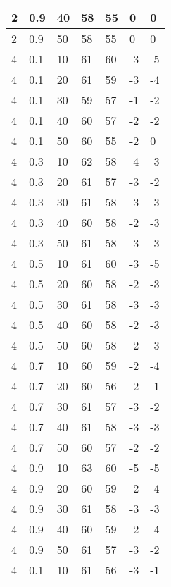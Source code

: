 \begin{longtable}{|l|l|l|l|l|l|l|}
		2     & 0.9 & 40   & 58 & 55 & 0   & 0   \\ \hline
		2     & 0.9 & 50   & 58 & 55 & 0   & 0   \\ \hline
		4     & 0.1 & 10   & 61 & 60 & -3  & -5  \\ \hline
		4     & 0.1 & 20   & 61 & 59 & -3  & -4  \\ \hline
		4     & 0.1 & 30   & 59 & 57 & -1  & -2  \\ \hline
		4     & 0.1 & 40   & 60 & 57 & -2  & -2  \\ \hline
		4     & 0.1 & 50   & 60 & 55 & -2  & 0   \\ \hline
		4     & 0.3 & 10   & 62 & 58 & -4  & -3  \\ \hline
		4     & 0.3 & 20   & 61 & 57 & -3  & -2  \\ \hline
		4     & 0.3 & 30   & 61 & 58 & -3  & -3  \\ \hline
		4     & 0.3 & 40   & 60 & 58 & -2  & -3  \\ \hline
		4     & 0.3 & 50   & 61 & 58 & -3  & -3  \\ \hline
		4     & 0.5 & 10   & 61 & 60 & -3  & -5  \\ \hline
		4     & 0.5 & 20   & 60 & 58 & -2  & -3  \\ \hline
		4     & 0.5 & 30   & 61 & 58 & -3  & -3  \\ \hline
		4     & 0.5 & 40   & 60 & 58 & -2  & -3  \\ \hline
		4     & 0.5 & 50   & 60 & 58 & -2  & -3  \\ \hline
		4     & 0.7 & 10   & 60 & 59 & -2  & -4  \\ \hline
		4     & 0.7 & 20   & 60 & 56 & -2  & -1  \\ \hline
		4     & 0.7 & 30   & 61 & 57 & -3  & -2  \\ \hline
		4     & 0.7 & 40   & 61 & 58 & -3  & -3  \\ \hline
		4     & 0.7 & 50   & 60 & 57 & -2  & -2  \\ \hline
		4     & 0.9 & 10   & 63 & 60 & -5  & -5  \\ \hline
		4     & 0.9 & 20   & 60 & 59 & -2  & -4  \\ \hline
		4     & 0.9 & 30   & 61 & 58 & -3  & -3  \\ \hline
		4     & 0.9 & 40   & 60 & 59 & -2  & -4  \\ \hline
		4     & 0.9 & 50   & 61 & 57 & -3  & -2  \\ \hline
		4     & 0.1 & 10   & 61 & 56 & -3  & -1  \\ \hline

\end{longtable}
